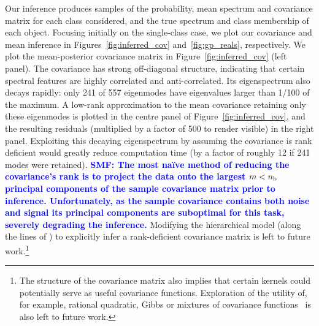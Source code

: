 \documentclass[a4paper,fleqn,usenatbib]{mnras}
\newcommand{\nb}{n_{\rm b}}
\newcommand{\smf}[1]{\textbf{\textcolor{blue}{SMF: #1}}}
\begin{document}
Our inference produces samples of the probability, mean spectrum and covariance matrix for each class considered, and the true spectrum and class membership of each object. Focusing initially on the single-class case, we plot our covariance and mean inference in Figures~\ref{fig:inferred_cov} and~\ref{fig:gp_reals}, respectively. We plot the mean-posterior covariance matrix in Figure~\ref{fig:inferred_cov} (left panel). The covariance has strong off-diagonal structure, indicating that certain spectral features are highly correlated and anti-correlated. Its eigenspectrum also decays rapidly: only 241 of 557 eigenmodes have eigenvalues larger than 1/100 of the maximum. A low-rank approximation to the mean covariance retaining only these eigenmodes is plotted in the centre panel of Figure~\ref{fig:inferred_cov}, and the resulting residuals (multiplied by a factor of 500 to render visible) in the right panel. Exploiting this decaying eigenspectrum by assuming the covariance is rank deficient would greatly reduce computation time (by a factor of roughly 12 if 241 modes were retained). \smf{The most na\"ive method of reducing the covariance's rank is to project the data onto the largest $m < \nb$ principal components of the sample covariance matrix prior to inference. Unfortunately, as the sample covariance contains both noise and signal its principal components are suboptimal for this task, severely degrading the inference.} Modifying the hierarchical model (along the lines of \citet{Zhang_etal:2013}) to explicitly infer a rank-deficient covariance matrix is left to future work.\footnote{The structure of the covariance matrix also implies that certain kernels could potentially serve as useful covariance functions. Exploration of the utility of, for example, rational quadratic, Gibbs or mixtures of covariance functions~\citep{Rasmussen_Williams} is also left to future work.}
\end{document}
